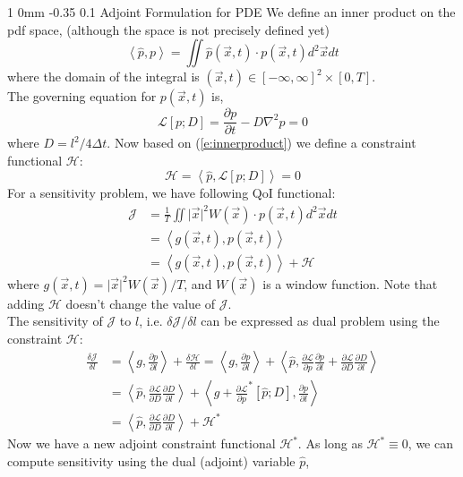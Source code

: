 \documentclass[11pt]{article}
\makeatletter
\renewcommand{\subsection}{\@startsection
{subsection}%
{1}%
{0mm}%
{-0.35\baselineskip}%
{0.1\baselineskip}%
{\normalfont\large\bfseries\color{brown}}}%
\def\Dpartial#1#2{ \frac{\partial #1}{\partial #2} }
\def\Del#1#2{ \frac{\delta #1}{\delta #2} }
\newcommand{\vx}{\vec{x}}
\newcommand{\Dt}{\Delta t}
\newcommand{\ph}{\hat{p}}
\newcommand{\inprod}[2]{\left\langle#1,#2\right\rangle}
\newcommand{\cH}{\mathcal{H}}
\newcommand{\cJ}{\mathcal{J}}
\newcommand{\cL}{\mathcal{L}}
\makeatother
\begin{document}
\subsection{Adjoint Formulation for PDE}
\label{app2}
We define an inner product on the pdf space, (although the space is not precisely defined yet)
\begin{equation}
\inprod{\hat{p}}{p} = \iint \hat{p}(\vx,t)\cdot p(\vx,t) d^2\vx dt
\label{e:innerproduct}
\end{equation}
where the domain of the integral is $(\vx,t)\in[-\infty,\infty]^2\times[0,T]$.\\
The governing equation for $p(\vx,t)$ is,
\begin{equation}
\cL[p;D] = \Dpartial{p}{t} - D\nabla^2p = 0
\end{equation}
where $D = l^2/4\Dt$.
Now based on (\ref{e:innerproduct}) we define a constraint functional $\cH$:
\begin{equation}
\cH = \inprod{\hat{p}}{\cL[p;D]} = 0
\label{e:H}
\end{equation}
For a sensitivity problem, we have following QoI functional:
\begin{equation}
\begin{split}
\cJ &= \frac{1}{T}\iint \vert\vx\vert^2W(\vx)\cdot p(\vx,t) d^2\vx dt\\
&= \inprod{g(\vx,t)}{p(\vx,t)}\\
&= \inprod{g(\vx,t)}{p(\vx,t)} + \cH
\label{e:J}
\end{split}
\end{equation}
where $g(\vx,t) = \vert\vx\vert^2W(\vx)/T$, and $W(\vx)$ is a window function.
Note that adding $\cH$ doesn't change the value of $\cJ$.\\
The sensitivity of $\cJ$ to $l$, i.e. $\delta\cJ/\delta l$ can be expressed as dual problem using the constraint $\cH$:
\begin{equation}
\begin{split}
\Del{\cJ}{l} &= \inprod{g}{\Dpartial{p}{l}} + \Del{\cH}{l} = \inprod{g}{\Dpartial{p}{l}} + \inprod{\ph}{\Dpartial{\cL}{p}\Dpartial{p}{l} + \Dpartial{\cL}{D}\Dpartial{D}{l}}\\
&= \inprod{\ph}{\Dpartial{\cL}{D}\Dpartial{D}{l}} + \inprod{g+\Dpartial{\cL}{p}^*[\ph;D]}{\Dpartial{p}{l}}\\
&= \inprod{\ph}{\Dpartial{\cL}{D}\Dpartial{D}{l}} + \cH^*
\end{split}
\end{equation}
Now we have a new adjoint constraint functional $\cH^*$.
As long as $\cH^*\equiv0$, we can compute sensitivity using the dual (adjoint) variable $\ph$,
\end{document}
